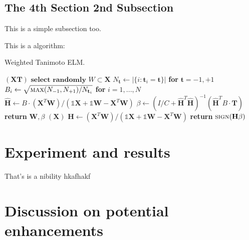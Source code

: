 \documentclass[lettersize,journal,12pt]{IEEEtran}
\begin{document}
\subsection{The 4th Section 2nd Subsection}

This is a simple subsection too.

This is a algorithm:

\begin{algorithm}[H]
	\caption{Weighted Tanimoto ELM.}\label{alg:alg1}
	\begin{algorithmic}
		\STATE
		$(\mathbf{X} \mathbf{T})$
		\STATE \hspace{0.5cm}$ \textbf{select randomly } W \subset \mathbf{X}  $
		\STATE \hspace{0.5cm}$ N_\mathbf{t} \gets | \{ i : \mathbf{t}_i = \mathbf{t} \} | $ \textbf{ for } $ \mathbf{t}= -1,+1 $
		\STATE \hspace{0.5cm}$ B_i \gets \sqrt{ \textsc{max}(N_{-1},N_{+1}) / N_{\mathbf{t}_i} } $ \textbf{ for } $ i = 1,...,N $
		\STATE \hspace{0.5cm}$ \hat{\mathbf{H}} \gets  B \cdot (\mathbf{X}^T\textbf{W})/( \mathbb{1}\mathbf{X} + \mathbb{1}\textbf{W} - \mathbf{X}^T\textbf{W} ) $
		\STATE \hspace{0.5cm}$ \beta \gets \left ( I/C + \hat{\mathbf{H}}^T\hat{\mathbf{H}} \right )^{-1}(\hat{\mathbf{H}}^T B\cdot \mathbf{T})  $
		\STATE \hspace{0.5cm}\textbf{return}  $\textbf{W},  \beta $
		\STATE
		$(\mathbf{X} )$
		\STATE \hspace{0.5cm}$ \mathbf{H} \gets  (\mathbf{X}^T\textbf{W} )/( \mathbb{1}\mathbf{X}  + \mathbb{1}\textbf{W}- \mathbf{X}^T\textbf{W}  ) $
		\STATE \hspace{0.5cm}\textbf{return}  $\textsc{sign}( \mathbf{H} \beta )$
	\end{algorithmic}
	\label{alg1}
\end{algorithm}

\section{Experiment and results }

That's is a nibility hkafhakf

\section{Discussion on potential enhancements}
\end{document}
